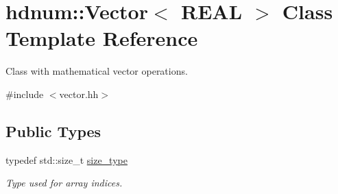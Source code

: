 \hypertarget{classhdnum_1_1Vector}{
\section{hdnum::Vector$<$ REAL $>$ Class Template Reference}
\label{classhdnum_1_1Vector}
}


Class with mathematical vector operations.  




{\ttfamily \#include $<$vector.hh$>$}

\subsection*{Public Types}
\begin{DoxyCompactItemize}
\item 
\hypertarget{classhdnum_1_1Vector_a21a951721fb2e12d8e1550f637fcb06d}{
typedef std::size\_\-t \hyperlink{classhdnum_1_1Vector_a21a951721fb2e12d8e1550f637fcb06d}{size\_\-type}}
\label{classhdnum_1_1Vector_a21a951721fb2e12d8e1550f637fcb06d}

\begin{DoxyCompactList}\small\item\em Type used for array indices. \item\end{DoxyCompactList}\end{DoxyCompactItemize}

